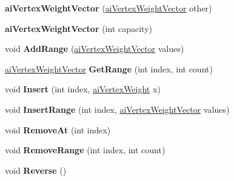 \begin{DoxyCompactItemize}
\item 
\hypertarget{classai_vertex_weight_vector_ac70bd72adc8aa4c1277b4a81369ac94b}{{\bfseries ai\+Vertex\+Weight\+Vector} (\hyperlink{classai_vertex_weight_vector}{ai\+Vertex\+Weight\+Vector} other)}\label{classai_vertex_weight_vector_ac70bd72adc8aa4c1277b4a81369ac94b}

\item 
\hypertarget{classai_vertex_weight_vector_a29be2a18a39501e642955093dad5364e}{{\bfseries ai\+Vertex\+Weight\+Vector} (int capacity)}\label{classai_vertex_weight_vector_a29be2a18a39501e642955093dad5364e}

\item 
\hypertarget{classai_vertex_weight_vector_af9b1de0d382a43629b3f2cc23a568d49}{void {\bfseries Add\+Range} (\hyperlink{classai_vertex_weight_vector}{ai\+Vertex\+Weight\+Vector} values)}\label{classai_vertex_weight_vector_af9b1de0d382a43629b3f2cc23a568d49}

\item 
\hypertarget{classai_vertex_weight_vector_a83bd9a590389de9709eb7d76084ceb66}{\hyperlink{classai_vertex_weight_vector}{ai\+Vertex\+Weight\+Vector} {\bfseries Get\+Range} (int index, int count)}\label{classai_vertex_weight_vector_a83bd9a590389de9709eb7d76084ceb66}

\item 
\hypertarget{classai_vertex_weight_vector_a0ecde4b849a321828e4a771dca0a1af5}{void {\bfseries Insert} (int index, \hyperlink{structai_vertex_weight}{ai\+Vertex\+Weight} x)}\label{classai_vertex_weight_vector_a0ecde4b849a321828e4a771dca0a1af5}

\item 
\hypertarget{classai_vertex_weight_vector_a4afb415c088f4161b5925ae185eed3a4}{void {\bfseries Insert\+Range} (int index, \hyperlink{classai_vertex_weight_vector}{ai\+Vertex\+Weight\+Vector} values)}\label{classai_vertex_weight_vector_a4afb415c088f4161b5925ae185eed3a4}

\item 
\hypertarget{classai_vertex_weight_vector_a60a3daa0e2661c6cb93ae0b086a6a58c}{void {\bfseries Remove\+At} (int index)}\label{classai_vertex_weight_vector_a60a3daa0e2661c6cb93ae0b086a6a58c}

\item 
\hypertarget{classai_vertex_weight_vector_ac72cf4a7b40a411ee2200f4dde518e1a}{void {\bfseries Remove\+Range} (int index, int count)}\label{classai_vertex_weight_vector_ac72cf4a7b40a411ee2200f4dde518e1a}

\item 
\hypertarget{classai_vertex_weight_vector_a76555873c7e2cab4890962992fe344fb}{void {\bfseries Reverse} ()}\label{classai_vertex_weight_vector_a76555873c7e2cab4890962992fe344fb}


\end{DoxyCompactItemize}
